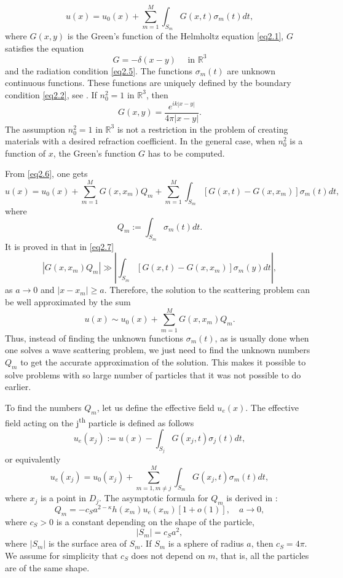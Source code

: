 \documentclass{wap}
\newcommand{\be}{\begin{equation}}
\newcommand{\ee}{\end{equation}}
\begin{document}
\be \label{eq2.6}
    u(x)=u_0(x)+\sum_{m=1}^M \int_{S_m} G(x,t)\sigma_m(t)dt,
\ee
where $G(x,y)$ is the Green's function of the Helmholtz equation \eqref{eq2.1},
$G$ satisfies the equation
\be
	[\nabla^2 + k^2 n_0^2(x)] G = -\delta(x-y) \quad \text{ in } \mathbb{R}^3
\ee
and the radiation condition \eqref{eq2.5}. The functions  $\sigma_m(t)$ are unknown continuous functions.
 These functions are uniquely defined by the boundary condition \eqref{eq2.2}, see \cite{R632}.
If $n_0^2=1$ in $\mathbb{R}^3$, then
\be \label{eq2.6a}
	G(x,y)=\frac{e^{ik|x-y|}}{4\pi|x-y|}.
\ee
The assumption  $n_0^2=1$ in $\mathbb{R}^3$ is not a restriction in the problem of creating materials
with a desired refraction coefficient. In the general case, when  $n_0^2$ is a function of $x$,
the Green's function $G$ has to be computed.

From \eqref{eq2.6}, one gets
\be \label{eq2.7}
    u(x)=u_0(x) + \sum_{m=1}^M G(x,x_m)Q_m + \sum_{m=1}^M \int_{S_m} [G(x,t)-G(x,x_m)] \sigma_m(t)dt,
\ee
where
\be \label{eq2.8}
    Q_m:=\int_{S_m} \sigma_m(t)dt.
\ee
It is proved in \cite{R635} that in \eqref{eq2.7}
\be \label{eq2.9}
    |G(x,x_m)Q_m| \gg \left|\int_{S_m} [G(x,t)-G(x,x_m)] \sigma_m(y)dt\right|,
\ee
as $a \to 0$ and $|x-x_m| \geq a$.
Therefore, the solution to the scattering problem can be well approximated by the sum
\be \label{eq2.10}
    u(x) \sim u_0(x)+\sum_{m=1}^M G(x,x_m)Q_m.
\ee
Thus, instead of finding the unknown functions $\sigma_m(t)$, as is usually done when one solves a
wave scattering problem,  we just need to find the unknown numbers $Q_m$ to get the accurate approximation of the solution.
This makes it possible to solve problems with so large number of particles that it was not possible to do earlier.

To find the numbers $Q_m$, let us define the effective field $u_e(x)$.
The effective field acting on the j\textsuperscript{th} particle is defined as follows
\be \label{eq2.11}
    u_e(x_j):=u(x)-\int_{S_j} G(x_j,t)\sigma_j(t)dt,
\ee
or equivalently
\be \label{eq2.12}
    u_e(x_j)=u_0(x_j)+\sum_{m=1 ,m \neq j}^M \int_{S_m} G(x_j,t)\sigma_m(t)dt,
\ee
where $x_j$ is a point in $D_j$.
The asymptotic formula for $Q_m$ is derived in \cite{R635}:
\be \label{eq2.13}
    Q_m = -c_S a^{2-\kappa} h(x_m)u_e(x_m)[1+o(1)], \quad a \to 0,
\ee
where $c_S>0$ is a constant depending on the shape of the particle,
\be
	|S_m|=c_Sa^2,
\ee
where $|S_m|$ is the surface area of $S_m$. If $S_m$ is a sphere of radius $a$, then $c_S=4\pi$. We assume for simplicity that $c_S$ does not depend on $m$, that is, all the particles are of the same shape.
\end{document}
